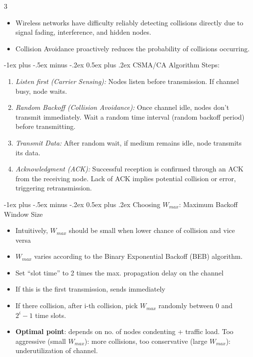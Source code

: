 \documentclass[a4paper, 9pt, landscape]{extarticle}
\makeatletter
\renewcommand{\subsubsection}{\@startsection{paragraph}{4}{0mm}%
                                {-1ex plus -.5ex minus -.2ex}%
                                {0.5ex plus .2ex}%
                                {\normalfont\footnotesize\bfseries}}
\makeatother
\begin{document}
\begin{multicols*}{3}
\begin{itemize}
  \item Wireless networks have difficulty reliably detecting collisions directly due to signal
  fading, interference, and hidden nodes.
  \item Collision Avoidance proactively reduces the probability of collisions occurring.
\end{itemize}


\subsubsection{CSMA/CA Algorithm Steps:}
\begin{enumerate}
  \item \textit{Listen first (Carrier Sensing):} Nodes listen before transmission. If channel busy, node waits.
  \item \textit{Random Backoff (Collision Avoidance):} Once channel idle, nodes don't transmit immediately. Wait a random time interval (random backoff period) before transmitting.
  \item \textit{Transmit Data:} After random wait, if medium remains idle, node transmits its data.
  \item \textit{Acknowledgment (ACK):} Successful reception is confirmed through an ACK from the receiving node. Lack of ACK implies potential collision or error, triggering retransmission.
\end{enumerate}

\subsubsection{Choosing $W_{max}$: Maximum Backoff Window Size}
\begin{itemize}
  \item Intuitively, $W_{max}$ should be small when lower chance of collision
  and vice versa
  \item $W_{max}$ varies according to the Binary Exponential Backoff (BEB) algorithm.
  \item Set “slot time” to 2 times the max. propagation delay on the channel
  \item If this is the first transmission, sends immediately
  \item If there collision, after i-th collision, pick $W_{max}$ randomly between $0$ and $2^i -1$ time slots.
  \item \textbf{Optimal point}: depends on no. of nodes condenting + traffic load. Too aggressive (small $W_{max}$): more collisions, too conservative (large $W_{max}$): underutilization of channel.
\end{itemize}


\end{multicols*}
\end{document}
